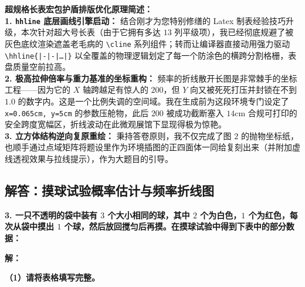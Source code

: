 \vspace{0.6cm}

{\small\color{blue!70!black}
\textbf{超规格长表宏包护盾排版优化原理简述：}\\
\textbf{1. \texttt{hhline} 底层画线引擎启动：} 结合刚才为您特别修缮的 Latex 制表经验技巧升级，本次针对超大号长表（由于它拥有多达 $13$ 列平级项），我已经彻底规避了被灰色底纹渲染遮盖老毛病的 \texttt{\textbackslash cline} 系列组件；转而让编译器直接动用强力驱动 \texttt{\textbackslash hhline\{|-|-|\dots|\}} 以全覆盖的物理逻辑划定了每一个防涂色的横跨分割格栅，表盘质量空前拉高。\\
\textbf{2. 极高拉伸倍率与重力基准的坐标重构：} 频率的折线散开长图是非常棘手的坐标工程——因为它的 $X$ 轴跨越足有惊人的 $200$，但 $Y$ 向又被死死打压并封锁在不到 $1.0$ 的数字内。这是一个比例失调的空间域。我在生成前为这段环境专门设定了 \texttt{x=0.065cm, y=5cm} 的参数压舱物，此后 $200$ 被成功截断塞入 $14\text{cm}$ 合规可打印的安全跨度宽幅区，折线波动在此微观展馆下显现得极为惊艳。\\
\textbf{3. 立方体结构逆向复原重绘：} 秉持答卷原则，我不仅完成了图 $2$ 的抛物坐标纸，也顺手通过点域矩阵将题设里作为环境插图的正四面体一同给复刻出来（并附加虚线透视效果与拉线提示），作为大题目的引导。
}

\newpage

\newpage

\subsection{解答：摸球试验概率估计与频率折线图}

\vspace{0.6cm}

\textbf{3. 一只不透明的袋中装有 $3$ 个大小相同的球，其中 $2$ 个为白色，$1$ 个为红色，每次从袋中摸出 $1$ 个球，然后放回搅匀后再摸。在摸球试验中得到下表中的部分数据：}

\vspace{0.4cm}

\textbf{解：}

\textbf{（1）请将表格填写完整。}

